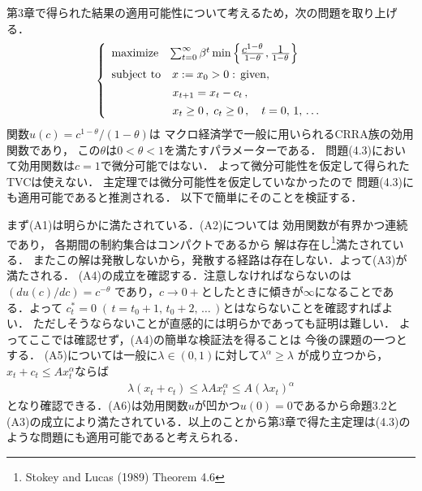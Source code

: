 \documentclass[a4paper,11pt]{jsarticle}
\DeclareRobustCommand{\lfrac}[2]{{\lower.4ex\hbox{\begingroup\ensuremath{#1}\endgroup}\over{\hspace{.2mm}#2\hspace{.2mm}}}}
\begin{document}
第3章で得られた結果の適用可能性について考えるため，次の問題を取り上げる．
\begin{align}
	\left\{
		\begin{array}{l}
			\mathrm{maximize} \hspace{3mm} \sum_{t=0}^\infty \beta^t \min \left\{ \lfrac{c^{1-\theta}}{1-\theta}\hspace{.2mm},\lfrac{1}{1-\theta}\right\} \vspace{1.4mm}\\
			\mathrm{subject}\hspace{1.2mm}\mathrm{to}\quad x:=x_0 > 0 :\, \mathrm{given},
			\vspace{1.4mm}\\
			\hspace{18.9mm}x_{t+1}=x_t-c_t\,,\vspace{1.4mm}\\
			\hspace{18.9mm}x_t \geq 0\,,\;c_t\geq 0\,,\quad t=0,\,1,\,\ldots
		\end{array}
        \right.
\end{align}
関数$u(c)=c^{1-\theta}/(1-\theta)$は
マクロ経済学で一般に用いられるCRRA族の効用関数であり，
この$\theta$は$0<\theta<1$を満たすパラメーターである．
問題(4.3)において効用関数は$c=1$で微分可能ではない．
よって微分可能性を仮定して得られたTVCは使えない．
主定理では微分可能性を仮定していなかったので
問題(4.3)にも適用可能であると推測される．
以下で簡単にそのことを検証する．

まず(A1)は明らかに満たされている．(A2)については
効用関数が有界かつ連続であり，
各期間の制約集合はコンパクトであるから
解は存在し\footnote{Stokey and Lucas (1989) Theorem 4.6}満たされている．
またこの解は発散しないから，発散する経路は存在しない．よって(A3)が満たされる．
(A4)の成立を確認する．注意しなければならないのは
$(du(c)/dc)=c^{-\theta}$
であり，$c\to 0+$としたときに傾きが$\infty$になることである．よって
$c_t^*=0 \;(\,t=t_0+1,\,t_0+2,\,\ldots \,)$とはならないことを確認すればよい．
ただしそうならないことが直感的には明らかであっても証明は難しい．
よってここでは確認せず，(A4)の簡単な検証法を得ることは
今後の課題の一つとする．
(A5)については一般に$\lambda \in (0,1)$に対して$\lambda^\alpha \geq \lambda$
が成り立つから，$x_t+c_t \leq A x_t^\alpha$ならば
\begin{align*}
	\lambda (x_t+c_t)\leq \lambda A x_t^\alpha \leq A(\lambda x_t)^\alpha
\end{align*}
となり確認できる．(A6)は効用関数$u$が凹かつ$u(0)=0$であるから命題3.2と(A3)の成立により満たされている．以上のことから第3章で得た主定理は(4.3)のような問題にも適用可能であると考えられる．
\end{document}
